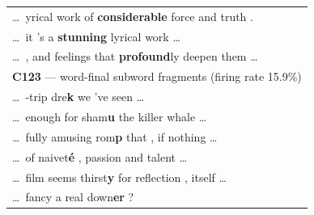 \begin{table}[tb]
\begin{tabularx}{\linewidth}{@{}>{\ttfamily}X@{}}
        \dots\ yrical work of\textbf{ considerable} force and truth .\\
        \dots\ it 's a\textbf{ stunning} lyrical work \dots\\
        \dots\ , and feelings that\textbf{ profound}ly deepen them \dots\\
        \addlinespace
        {\normalfont\textbf{C123} --- word-final subword fragments \hfill (firing rate 15.9\%)}\\
        \cmidrule(){1-1}
        \dots\ -trip dre\textbf{k} we 've seen \dots\\
        \dots\ enough for sham\textbf{u} the killer whale \dots\\
        \dots\ fully amusing rom\textbf{p} that , if nothing \dots\\
        \dots\ of naivet\textbf{é} , passion and talent \dots\\
        \dots\ film seems thirst\textbf{y} for reflection , itself \dots\\
        \dots\ fancy a real down\textbf{er} ?\\

\end{tabularx}
\end{table}
